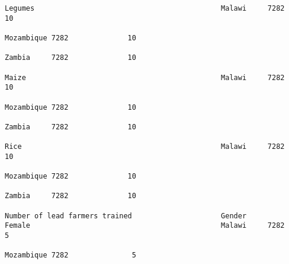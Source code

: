 \documentclass[11pt]{article}
\begin{document}
\begin{Verbatim}[commandchars=\\\{\}]
                                                                                                                                                              Legumes                                            Malawi     7282              10  
                                                                                                                                                                                                                 Mozambique 7282              10  
                                                                                                                                                                                                                 Zambia     7282              10  
                                                                                                                                                              Maize                                              Malawi     7282              10  
                                                                                                                                                                                                                 Mozambique 7282              10  
                                                                                                                                                                                                                 Zambia     7282              10  
                                                                                                                                                              Rice                                               Malawi     7282              10  
                                                                                                                                                                                                                 Mozambique 7282              10  
                                                                                                                                                                                                                 Zambia     7282              10  
                                                                         Number of lead farmers trained                     Gender                            Female                                             Malawi     7282               5  
                                                                                                                                                                                                                 Mozambique 7282               5  

\end{Verbatim}
\end{document}
